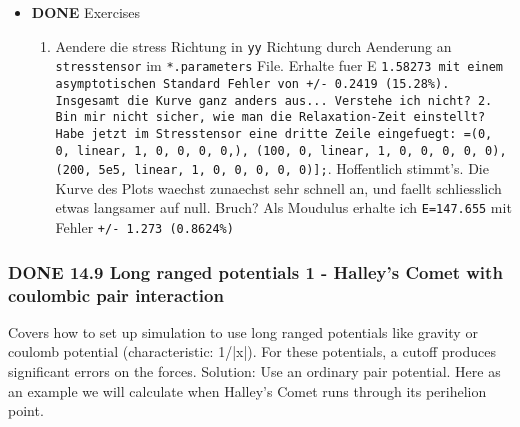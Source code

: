 \documentclass[11pt]{article}
\begin{document}
\begin{itemize}

\item \textbf{DONE} Exercises\\
\label{sec-2.4.8.1}

\begin{enumerate}
\item Aendere die stress Richtung in \texttt{yy} Richtung durch Aenderung an \texttt{stresstensor} im \texttt{*.parameters} File. 
   Erhalte fuer E \texttt{1.58273 mit einem asymptotischen Standard Fehler von +/- 0.2419 (15.28\%). Insgesamt die Kurve ganz anders aus... Verstehe ich nicht?  2. Bin mir nicht sicher, wie man die Relaxation-Zeit einstellt? Habe jetzt im Stresstensor eine dritte Zeile eingefuegt: =(0, 0, linear, 1, 0, 0, 0, 0,), (100, 0, linear, 1, 0, 0, 0, 0, 0), (200, 5e5, linear, 1, 0, 0, 0, 0, 0)];}. 
   Hoffentlich stimmt's. 
   Die Kurve des Plots waechst zunaechst sehr schnell an, und faellt schliesslich etwas langsamer auf null. Bruch? Als Moudulus erhalte ich \texttt{E=147.655} mit Fehler \texttt{+/- 1.273 (0.8624\%)}
\end{enumerate}
\end{itemize} %
\subsubsection{\textbf{DONE} 14.9 Long ranged potentials 1 - Halley's Comet with coulombic pair interaction}
\label{sec-2.4.9}


Covers how to set up simulation to use long ranged potentials like gravity or coulomb potential (characteristic: 1/|x|). 
For these potentials, a cutoff produces significant errors on the forces. 
Solution: Use an ordinary pair potential. 
Here as an example we will calculate when Halley's Comet runs through its perihelion point. 
\end{document}
